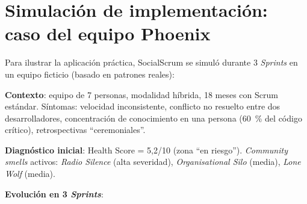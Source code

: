 \section[Simulación de implementación: caso del equipo Phoenix]{Simulación de implementación:\\ caso del equipo Phoenix}

Para ilustrar la aplicación práctica, SocialScrum se simuló durante 3 \textit{Sprints} en un equipo ficticio (basado en patrones reales):

\textbf{Contexto}: equipo de 7 personas, modalidad híbrida, 18 meses con Scrum estándar. Síntomas: velocidad inconsistente, conflicto no resuelto entre dos desarrolladores, concentración de conocimiento en una persona (60~\% del código crítico), retrospectivas ``ceremoniales''.

\textbf{Diagnóstico inicial}: Health Score = 5,2/10 (zona ``en riesgo''). \textit{Community smells} activos: \textit{Radio Silence} (alta severidad), \textit{Organisational Silo} (media), \textit{Lone Wolf} (media).

\textbf{Evolución en 3 \textit{Sprints}}:

\begingroup
\scriptsize
\renewcommand{\arraystretch}{1.4}
\setlength{\tabcolsep}{4pt}
\setlength{\LTleft}{0pt}
\setlength{\LTright}{0pt}

